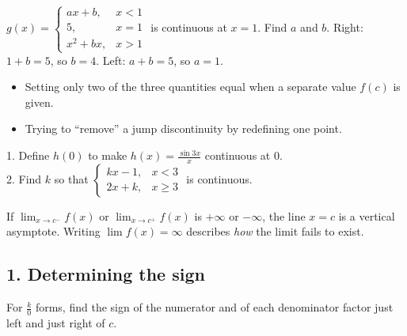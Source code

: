\begin{example}
$g(x)=\begin{cases}ax+b, & x<1\\ 5, & x=1\\ x^2+bx, & x>1\end{cases}$ is continuous at $x=1$. Find $a$ and $b$.
\sol Right: $1+b=5$, so $b=4$. Left: $a+b=5$, so $a=1$.
\end{example}

\begin{mistakes}
\begin{itemize}
\item Setting only two of the three quantities equal when a separate value $f(c)$ is given.
\item Trying to ``remove'' a jump discontinuity by redefining one point.
\end{itemize}
\end{mistakes}

\begin{quickcheck}
1. Define $h(0)$ to make $h(x)=\frac{\sin 3x}{x}$ continuous at $0$.\\
2. Find $k$ so that $\begin{cases}kx-1,&x<3\\ 2x+k,&x\ge3\end{cases}$ is continuous.
\end{quickcheck}


\begin{keyidea}
If $\lim_{x\to c^-}f(x)$ or $\lim_{x\to c^+}f(x)$ is $+\infty$ or $-\infty$, the line $x=c$ is a vertical asymptote. Writing $\lim f(x)=\infty$ describes \emph{how} the limit fails to exist.
\end{keyidea}

\subsection*{1. Determining the sign}
For $\frac{k}{0}$ forms, find the sign of the numerator and of each denominator factor just left and just right of $c$.

